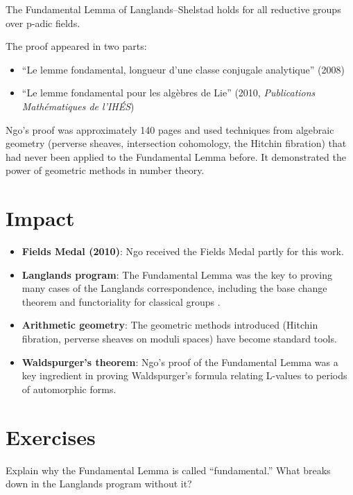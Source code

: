 \begin{theorem}
The Fundamental Lemma of Langlands--Shelstad holds for all reductive groups over p-adic fields.
\end{theorem}

The proof appeared in two parts:
\begin{itemize}
\item ``Le lemme fondamental, longueur d'une classe conjugale analytique'' (2008)
\item ``Le lemme fondamental pour les alg\`ebres de Lie'' (2010, \emph{Publications Math\'ematiques de l'IH\'ES})
\end{itemize}

\begin{highlightbox}
Ngo's proof was approximately 140 pages and used techniques from algebraic geometry (perverse sheaves, intersection cohomology, the Hitchin fibration) that had never been applied to the Fundamental Lemma before. It demonstrated the power of geometric methods in number theory.
\end{highlightbox}

\section{Impact}

\begin{itemize}
\item \textbf{Fields Medal (2010)}: Ngo received the Fields Medal partly for this work.
\item \textbf{Langlands program}: The Fundamental Lemma was the key to proving many cases of the Langlands correspondence, including the base change theorem and functoriality for classical groups \cite{clozel2008}.
\item \textbf{Arithmetic geometry}: The geometric methods introduced (Hitchin fibration, perverse sheaves on moduli spaces) have become standard tools.
\item \textbf{Waldspurger's theorem}: Ngo's proof of the Fundamental Lemma was a key ingredient in proving Waldspurger's formula relating L-values to periods of automorphic forms.
\end{itemize}

\section{Exercises}

\begin{exercise}[Basic]
Explain why the Fundamental Lemma is called ``fundamental.'' What breaks down in the Langlands program without it?
\end{exercise}

